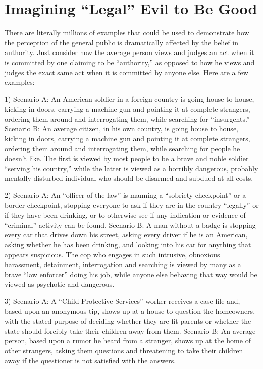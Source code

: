 \documentclass{book}
\begin{document}
\section{Imagining \enquote{Legal} Evil to Be Good}

There are literally millions of examples that could be used to demonstrate how the perception of the general public is dramatically affected by the belief in authority. Just consider how the average person views and judges an act when it is committed by one claiming to be \enquote{authority,} as opposed to how he views and judges the exact same act when it is committed by anyone else. Here are a few examples:

1) Scenario A: An American soldier in a foreign country is going house to house, kicking in doors, carrying a machine gun and pointing it at complete strangers, ordering them around and interrogating them, while searching for \enquote{insurgents.} Scenario B: An average citizen, in his own country, is going house to house, kicking in doors, carrying a machine gun and pointing it at complete strangers, ordering them around and interrogating them, while searching for people he doesn't like. The first is viewed by most people to be a brave and noble soldier \enquote{serving his country,} while the latter is viewed as a horribly dangerous, probably mentally disturbed individual who should be disarmed and subdued at all costs.

2) Scenario A: An \enquote{officer of the law} is manning a \enquote{sobriety checkpoint} or a border checkpoint, stopping everyone to ask if they are in the country \enquote{legally} or if they have been drinking, or to otherwise see if any indication or evidence of \enquote{criminal} activity can be found. Scenario B: A man without a badge is stopping every car that drives down his street, asking every driver if he is an American, asking whether he has been drinking, and looking into his car for anything that appears suspicious. The cop who engages in such intrusive, obnoxious harassment, detainment, interrogation and searching is viewed by many as a brave \enquote{law enforcer} doing his job, while anyone else behaving that way would be viewed as psychotic and dangerous.

3) Scenario A: A \enquote{Child Protective Services} worker receives a case file and, based upon an anonymous tip, shows up at a house to question the homeowners, with the stated purpose of deciding whether they are fit parents or whether the state should forcibly take their children away from them. Scenario B: An average person, based upon a rumor he heard from a stranger, shows up at the home of other strangers, asking them questions and threatening to take their children away if the questioner is not satisfied with the answers.
\end{document}
